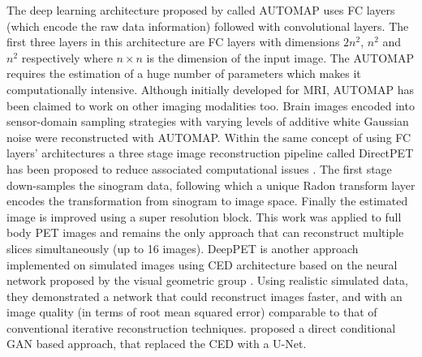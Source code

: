 The deep learning architecture proposed by \cite{zhu2018image} called AUTOMAP uses \ac{FC} layers (which encode the raw data information) followed with convolutional layers. The first three layers in this architecture are \ac{FC} layers with dimensions $2n^2$, $n^2$ and $n^2$ respectively where $n\times{}n$ is the dimension of the input image. The AUTOMAP requires the estimation of a huge number of parameters which makes it computationally intensive. Although initially developed for \ac{MRI}, AUTOMAP has been claimed to work on other imaging modalities too. Brain images encoded into sensor-domain sampling strategies with varying levels of additive white Gaussian noise were reconstructed with AUTOMAP.  Within the same concept of using \ac{FC} layers' architectures a three stage image reconstruction pipeline called DirectPET has been proposed to reduce associated computational issues  \cite{whiteley2019direct}. The first stage down-samples the sinogram data, following which a unique Radon transform layer encodes the transformation from sinogram to image space. Finally the estimated image is improved using a super resolution block. This work was applied to full body \ac{PET} images and remains the only approach that can reconstruct multiple slices simultaneously (up to 16 images). DeepPET is another approach implemented on simulated images using \ac{CED} architecture based on the neural network proposed by the visual geometric group \cite{haeggstroem2018deeprec}. Using realistic simulated data, they demonstrated a network that could reconstruct images faster, and with an image quality (in terms of root mean squared error) comparable to that of conventional iterative reconstruction techniques. \cite{liu2019deep} proposed a direct conditional \ac{GAN} based approach, that replaced the \ac{CED} with a U-Net.    



